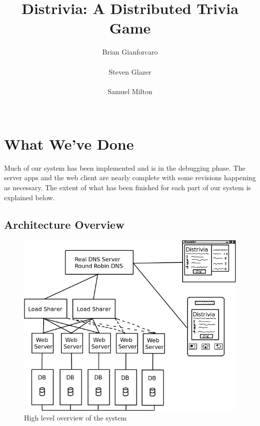 \documentclass{dependencies/acm_proc_article-sp}
\begin{document}
\title{ Distrivia: A Distributed Trivia Game }
\author{
\alignauthor
Brian Gianforcaro \\
       \\
\alignauthor
Steven Glazer \\
       \\
\alignauthor
Samuel Milton \\
       \\
}
\maketitle


\section {What We've Done}
Much of our system has been implemented and is in the debugging phase. The server apps and the web client are nearly complete with some revisions happening as necessary. The extent of what has been finished for each part of our system is explained below.

\subsection{Architecture Overview }
\begin{figure}[h!]
  \centering
    \includegraphics[scale=0.4]{diagram.png}
   \caption{High level overview of the system}
 \end{figure}
\end{document}
